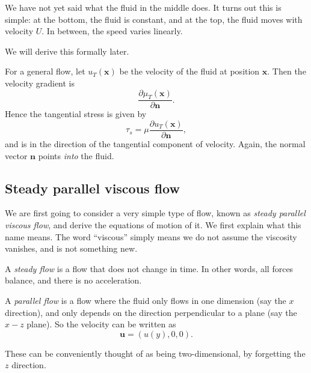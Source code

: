 \documentclass[a4paper]{article}
\begin{document}
We have not yet said what the fluid in the middle does. It turns out this is simple: at the bottom, the fluid is constant, and at the top, the fluid moves with velocity $U$. In between, the speed varies linearly.
\begin{center}
\end{center}
We will derive this formally later.

For a general flow, let $u_T(\mathbf{x})$ be the velocity of the fluid at position $\mathbf{x}$. Then the velocity gradient is
\[
  \frac{\partial \mu_T(\mathbf{x})}{\partial \mathbf{n}}.
\]
Hence the tangential stress is given by
\[
  \tau_s = \mu \frac{\partial u_T(\mathbf{x})}{\partial \mathbf{n}},
\]
and is in the direction of the tangential component of velocity. Again, the normal vector $\mathbf{n}$ points \emph{into} the fluid.

\subsection{Steady parallel viscous flow}
We are first going to consider a very simple type of flow, known as \emph{steady parallel viscous flow}, and derive the equations of motion of it. We first explain what this name means. The word ``viscous'' simply means we do not assume the viscosity vanishes, and is not something new.

\begin{defi}
  A \emph{steady flow} is a flow that does not change in time. In other words, all forces balance, and there is no acceleration.
\end{defi}

\begin{defi}
  A \emph{parallel flow} is a flow where the fluid only flows in one dimension (say the $x$ direction), and only depends on the direction perpendicular to a plane (say the $x-z$ plane). So the velocity can be written as
  \[
    \mathbf{u} = (u(y), 0, 0).
  \]
\end{defi}
These can be conveniently thought of as being two-dimensional, by forgetting the $z$ direction.
\end{document}
